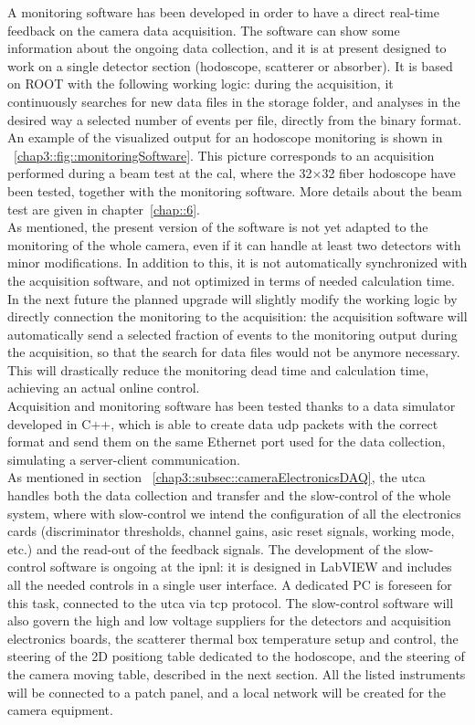 A monitoring software has been developed in order to have a direct real-time feedback on the camera data acquisition. The software can show some information about the ongoing data collection, and it is at present designed to work on a single detector section (hodoscope, scatterer or absorber). It is based on ROOT with the following working logic: during the acquisition, it continuously searches for new data files in the storage folder, and analyses in the desired way a selected number of events per file, directly from the binary format. An example of the visualized output for an hodoscope monitoring is shown in \figurename~\ref{chap3::fig::monitoringSoftware}. This picture corresponds to an acquisition performed during a beam test at the \gls{cal}, where the 32$\times$32 fiber hodoscope have been tested, together with the monitoring software. More details about the beam test are given in chapter~\ref{chap::6}.\\ As mentioned, the present version of the software is not yet adapted to the monitoring of the whole camera, even if it can handle at least two detectors with minor modifications. In addition to this, it is not automatically synchronized with the acquisition software, and not optimized in terms of needed calculation time. In the next future the planned upgrade will slightly modify the working logic by directly connection the monitoring to the acquisition: the acquisition software will automatically send a selected fraction of events to the monitoring output during the acquisition, so that the search for data files would not be anymore necessary. This will drastically reduce the monitoring dead time and calculation time, achieving an actual online control.\\
Acquisition and monitoring software has been tested thanks to a data simulator developed in C++, which is able to create data \gls{udp} packets with the correct format and send them on the same Ethernet port used for the data collection, simulating a server-client communication.\\

As mentioned in section~	\ref{chap3::subsec::cameraElectronicsDAQ}, the \gls{utca} handles both the data collection and transfer and the slow-control of the whole system, where with slow-control we intend the configuration of all the electronics cards (discriminator thresholds, channel gains, \gls{asic} reset signals, working mode, etc.) and the read-out of the feedback signals. The development of the slow-control software is ongoing at the \gls{ipnl}: it is designed in LabVIEW and includes all the needed controls in a single user interface. A dedicated PC is foreseen for this task, connected to the \gls{utca} via \gls{tcp} protocol. The slow-control software will also govern the high and low voltage suppliers for the detectors and acquisition electronics boards, the scatterer thermal box temperature setup and control, the steering of the 2D positiong table dedicated to the hodoscope, and the steering of the camera moving table, described in the next section. All the listed instruments will be connected to a patch panel, and a local network will be created for the camera equipment.      

